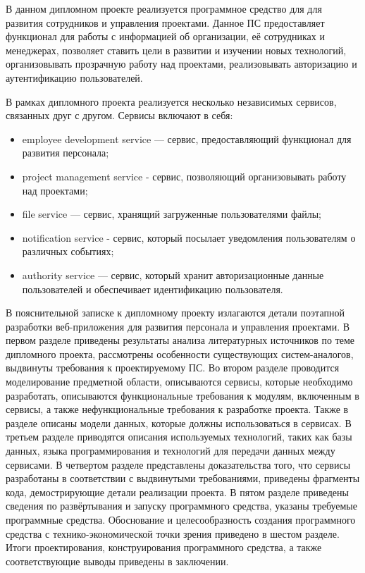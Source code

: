 В данном дипломном проекте реализуется программное средство для для развития сотрудников и управления проектами. Данное ПС предоставляет функционал для работы с информацией об организации, её сотрудниках и менеджерах, позволяет ставить цели в развитии и изучении новых технологий, организовывать прозрачную работу над проектами, реализовывать авторизацию и аутентификацию пользователей.

В рамках дипломного проекта реализуется несколько независимых сервисов, связанных друг с другом. Сервисы включают в себя:
\begin{itemize}
    \item employee development service — сервис, предоставляющий функционал для развития персонала;
    \item project management service - сервис, позволяющий организовывать работу над проектами;
    \item file service — сервис, хранящий загруженные пользователями файлы;
    \item notification service - сервис, который посылает уведомления пользователям о различных событиях;
    \item authority service — сервис, который хранит авторизационные данные пользователей и обеспечивает идентификацию пользователя.
\end{itemize}

В пояснительной записке к дипломному проекту излагаются детали поэтапной разработки веб-приложения для развития персонала и управления проектами. В первом разделе приведены результаты анализа литературных источников по теме дипломного проекта, рассмотрены особенности существующих систем-ана\-логов, выдвинуты требования к проектируемому ПС. Во втором разделе проводится моделирование предметной области, описываются сервисы, которые необходимо разработать, описываются функциональные требования к модулям, включенным в сервисы, а также нефункциональные требования к разработке проекта. Также в разделе описаны модели данных, которые должны использоваться в сервисах. В третьем разделе приводятся описания используемых технологий, таких как базы данных, языка программирования и технологий для передачи данных между сервисами. В четвертом разделе представлены доказательства того, что сервисы разработаны в соответствии с выдвинутыми требованиями, приведены фрагменты кода, демострирующие детали реализации проекта. В пятом разделе приведены сведения по развёртывания и запуску программного средства, указаны требуемые программные средства. Обоснование и целесообразность создания программного средства с технико-экономической точки зрения приведено в шестом разделе. Итоги проектирования, конструирования программного средства, а также соответствующие выводы приведены в заключении.

